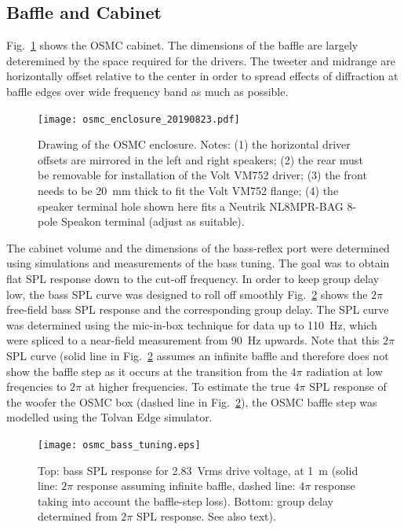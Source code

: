 \documentclass[12pt,a4paper]{article}
\providecommand{\figr}[1]{Fig.~\ref{fig:#1}}
\providecommand{\figlabel}[1]{\label{fig:#1}}
\begin{document}
\subsection{Baffle and Cabinet}

\figr{osmc_enclosure} shows the OSMC cabinet. The dimensions of the baffle are largely deteremined by the space required for the drivers. The tweeter and midrange are horizontally offset relative to the center in order to spread effects of diffraction at baffle edges over wide frequency band as much as possible.

\begin{figure}[tbp]
	\centering
	\texttt{[image: osmc\_enclosure\_20190823.pdf]}
	\caption{Drawing of the OSMC enclosure. Notes: (1) the horizontal driver offsets are mirrored in the left and right speakers; (2) the rear must be removable for installation of the Volt VM752 driver; (3) the front needs to be \SI{20}{mm} thick to fit the Volt VM752 flange; (4) the speaker terminal hole shown here fits a Neutrik NL8MPR-BAG 8-pole Speakon terminal (adjust as suitable).}
	\figlabel{osmc_enclosure}
\end{figure}

The cabinet volume and the dimensions of the bass-reflex port were determined using simulations and measurements of the bass tuning. The goal was to obtain flat SPL response down to the cut-off frequency. In order to keep group delay low, the bass SPL curve was designed to roll off smoothly \figr{osmc_bass_tuning} shows the $2\pi$ free-field bass SPL response and the corresponding group delay. The SPL curve was determined using the mic-in-box technique for data up to \SI{110}{Hz}, which were spliced to a near-field measurement from \SI{90}{Hz} upwards. Note that this $2\pi$ SPL curve (solid line in \figr{osmc_bass_tuning} assumes an infinite baffle and therefore does not show the baffle step as it occurs at the transition from the $4\pi$ radiation at low freqencies to $2\pi$ at higher frequencies. To estimate the true $4\pi$ SPL response of the woofer the OSMC box (dashed line in \figr{osmc_bass_tuning}), the OSMC baffle step was modelled using the Tolvan Edge simulator.

\begin{figure}[tb]
	\centering
	\texttt{[image: osmc\_bass\_tuning.eps]}
	\caption{Top: bass SPL response for \SI{2.83}{Vrms} drive voltage, at \SI{1}{m} (solid line: $2\pi$ response assuming infinite baffle, dashed line: $4\pi$ response taking into account the baffle-step loss). Bottom: group delay determined from $2\pi$ SPL response. See also text).}
	\figlabel{osmc_bass_tuning}
\end{figure}
\end{document}
